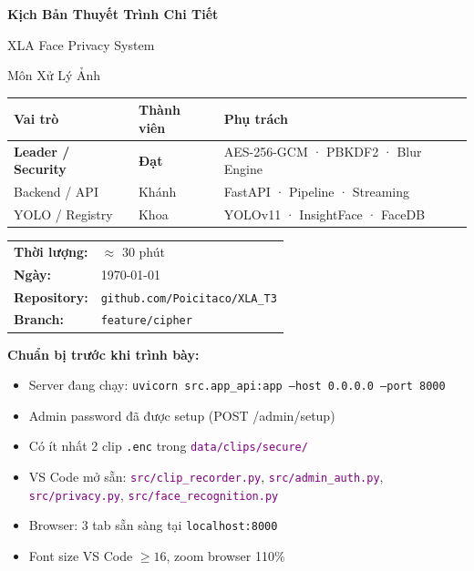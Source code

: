 \documentclass[12pt, a4paper]{article}
\newcommand{\fpath}[1]{\texttt{\textcolor{purple}{#1}}}
\begin{document}

\begin{titlepage}
\centering
\vspace*{2cm}
{\Huge\bfseries\color{NavyBlue} Kịch Bản Thuyết Trình Chi Tiết\par}
\vspace{0.5cm}
{\Large\color{MidnightBlue} XLA Face Privacy System\par}
\vspace{0.3cm}
{\large\color{gray} Môn Xử Lý Ảnh\par}
\vspace{1.5cm}

\begin{tcolorbox}[colback=NavyBlue!8, colframe=NavyBlue, width=0.85\textwidth]
\centering
\renewcommand{\arraystretch}{1.5}
\begin{tabular}{lll}
\textbf{Vai trò} & \textbf{Thành viên} & \textbf{Phụ trách} \\
\hline
\textcolor{BrickRed}{\textbf{Leader / Security}} & \textcolor{BrickRed}{\textbf{Đạt}} &
AES-256-GCM · PBKDF2 · Blur Engine \\
Backend / API & Khánh & FastAPI · Pipeline · Streaming \\
YOLO / Registry & Khoa & YOLOv11 · InsightFace · FaceDB \\
\end{tabular}
\end{tcolorbox}

\vspace{1.5cm}
\begin{tabular}{ll}
\textbf{Thời lượng:} & $\approx$ 30 phút \\
\textbf{Ngày:} & \today \\
\textbf{Repository:} & \texttt{github.com/Poicitaco/XLA\_T3} \\
\textbf{Branch:} & \texttt{feature/cipher} \\
\end{tabular}

\vspace{1.5cm}
\begin{note}
\textbf{Chuẩn bị trước khi trình bày:}
\begin{itemize}
  \item Server đang chạy: \texttt{uvicorn src.app\_api:app --host 0.0.0.0 --port 8000}
  \item Admin password đã được setup (POST /admin/setup)
  \item Có ít nhất 2 clip \texttt{.enc} trong \fpath{data/clips/secure/}
  \item VS Code mở sẵn: \fpath{src/clip\_recorder.py}, \fpath{src/admin\_auth.py}, \fpath{src/privacy.py}, \fpath{src/face\_recognition.py}
  \item Browser: 3 tab sẵn sàng tại \texttt{localhost:8000}
  \item Font size VS Code $\geq 16$, zoom browser 110\%
\end{itemize}
\end{note}
\end{titlepage}
\end{document}
